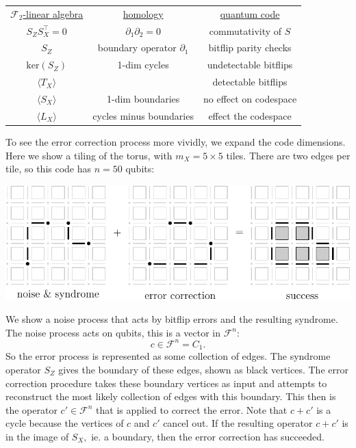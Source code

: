 \documentclass[11pt,oneside]{report}
\def\Span#1{\langle #1 \rangle}
\newcommand{\Field}{\mathcal{F}}
\def\Ker{\mathrm{ker}}
\begin{document}
\begin{center}
\bgroup
\def\arraystretch{1.3}
\begin{tabular}{ ccc }
\underline{$\Field_2$-linear algebra}
& \ \ \ \underline{homology}\ \ \   
& \ \ \ \underline{quantum code}\ \ \  \\
$S_Z S_X^\top = 0$ & $\partial_1 \partial_2 = 0$ & commutativity of $S$ \\
$S_Z$ & boundary operator $\partial_1$  & bitflip parity checks \\
$\Ker(S_Z)$ & 1-dim cycles                      & undetectable bitflips \\
$\Span{T_X}$ &                                  & detectable bitflips \\
$\Span{S_X}$ & 1-dim boundaries                 & no effect on codespace \\
$\Span{L_X}$ & cycles minus boundaries          & effect the codespace \\
\end{tabular}
\egroup
\end{center}



To see the error correction process more vividly, we expand the
code dimensions.
Here we show a tiling of the torus, with $m_X = 5\times 5$ tiles.
There are two edges per tile, so this code has $n=50$ qubits:
\begin{center}
\includegraphics[width=0.8\columnwidth]{pic-toric-suc.pdf}
\end{center}
We show a noise process that acts by bitflip errors
and the resulting syndrome.
The noise process acts on qubits, this is a vector in $\Field^n:$
$$
    c \in \Field^n = C_1.
$$
So the error process is represented as some collection of edges.
The syndrome operator $S_Z$ gives the boundary of these
edges, shown as black vertices.
The error correction procedure takes these boundary vertices
as input and attempts to reconstruct the most likely collection of
edges with this boundary. This then is the operator $c'\in\Field^n$
that is applied to correct the error.
Note that $c+c'$ is a cycle because the vertices of $c$ and $c'$ cancel out.
If the resulting operator $c+c'$ is in the image of $S_X,$
ie. a boundary, then the error correction has succeeded.
\end{document}

